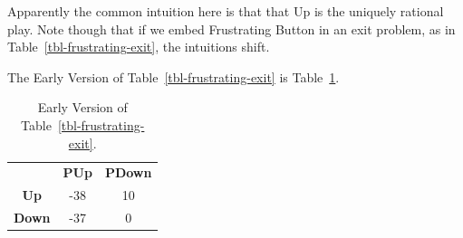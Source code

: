 \documentclass[
  12pt,
  letterpaper,
  DIV=11,
  numbers=noendperiod]{scrreprt}
\begin{document}
Apparently the common intuition here is that that Up is the uniquely
rational play. Note though that if we embed Frustrating Button in an
exit problem, as in Table~\ref{tbl-frustrating-exit}, the intuitions
shift.

\begin{table}

\caption{\label{tbl-frustrating-exit}An exit problem with Frustrating
Button in round 2.}

\begin{minipage}[t]{0.50\linewidth}



\end{minipage}%
%
\begin{minipage}[t]{0.50\linewidth}



\end{minipage}%

\end{table}%

The Early Version of Table~\ref{tbl-frustrating-exit} is
Table~\ref{tbl-ev-fe}.

\begin{longtable}[]{@{}ccc@{}}
\caption{Early Version of
Table~\ref{tbl-frustrating-exit}.}\label{tbl-ev-fe}\tabularnewline
\toprule\noalign{}
\endfirsthead
\endhead
\bottomrule\noalign{}
\endlastfoot
& \textbf{PUp} & \textbf{PDown} \\
\textbf{Up} & -38 & 10 \\
\textbf{Down} & -37 & 0 \\
\end{longtable}
\end{document}
